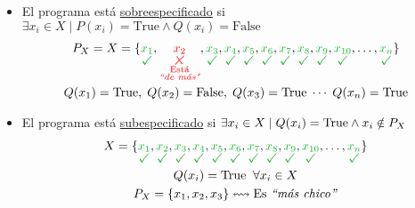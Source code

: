 \documentclass[../main.tex]{subfiles}
\begin{document}
\begin{itemize}
    \item El programa está \ul{sobreespecificado} si $\exists x_i \in X \mid P(x_i) = \text{True} \land Q(x_i) = \text{False}$ 
          \begin{gather*}
            P_X = X = \{
            \color{dark_green}\underset{\substack{\cmark}}{x_1}\color{black},
            \color{red}\underset{\substack{\xmark\\\T{Está}\\\T{\textit{``de más"}}}}{x_2}\color{black},
            \color{dark_green}\underset{\substack{\cmark}}{x_3}\color{black},
            \color{dark_green}\underset{\substack{\cmark}}{x_4}\color{black},
            \color{dark_green}\underset{\substack{\cmark}}{x_5}\color{black},
            \color{dark_green}\underset{\substack{\cmark}}{x_6}\color{black},
            \color{dark_green}\underset{\substack{\cmark}}{x_7}\color{black},
            \color{dark_green}\underset{\substack{\cmark}}{x_8}\color{black},
            \color{dark_green}\underset{\substack{\cmark}}{x_9}\color{black},
            \color{dark_green}\underset{\substack{\cmark}}{x_{10}}\color{black},
            \dots,
            \color{dark_green}\underset{\substack{\cmark}}{x_n}\color{black}\}
            \\
            Q(x_1) = \T{True},\;Q(x_2) = \T{False},\;Q(x_3) = \T{True}\;\cdots\;Q(x_n) = \T{True}
          \end{gather*}
    \item El programa está \ul{subespecificado} si $\exists x_i \in X \mid Q(x_i) = \text{True} \land x_i \notin P_X$
          \begin{gather*}
            X= \{
            \color{dark_green}\underset{\substack{\cmark}}{x_1}\color{black},
            \color{dark_green}\underset{\substack{\cmark}}{x_2}\color{black},
            \color{dark_green}\underset{\substack{\cmark}}{x_3}\color{black},
            \color{dark_green}\underset{\substack{\cmark}}{x_4}\color{black},
            \color{dark_green}\underset{\substack{\cmark}}{x_5}\color{black},
            \color{dark_green}\underset{\substack{\cmark}}{x_6}\color{black},
            \color{dark_green}\underset{\substack{\cmark}}{x_7}\color{black},
            \color{dark_green}\underset{\substack{\cmark}}{x_8}\color{black},
            \color{dark_green}\underset{\substack{\cmark}}{x_9}\color{black},
            \color{dark_green}\underset{\substack{\cmark}}{x_{10}}\color{black},
            \dots,
            \color{dark_green}\underset{\substack{\cmark}}{x_n}\color{black}\}
            \\
            Q(x_i) = \T{True}\;\;\forall x_i \in X
            \\
            P_X = \{x_1, x_2, x_3\} \leftrightsquigarrow \T{Es \textit{``más chico''}}
          \end{gather*}
\end{itemize}
\end{document}
